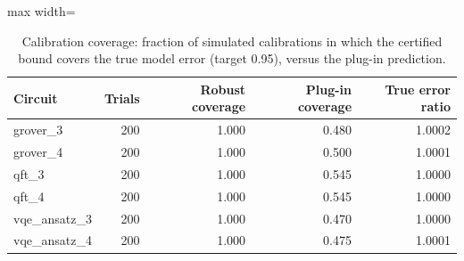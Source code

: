 \begin{table}[t]
\centering
\caption{Calibration coverage: fraction of simulated calibrations in which the certified bound covers the true model error (target 0.95), versus the plug-in prediction.}\label{tab:c4b}
\footnotesize
\begin{adjustbox}{max width=\columnwidth}
\begin{tabular}{lrrrr}
\toprule
Circuit & Trials & Robust coverage & Plug-in coverage & True error ratio \\
\midrule
grover\_3 & 200 & 1.000 & 0.480 & 1.0002 \\
grover\_4 & 200 & 1.000 & 0.500 & 1.0001 \\
qft\_3 & 200 & 1.000 & 0.545 & 1.0000 \\
qft\_4 & 200 & 1.000 & 0.545 & 1.0000 \\
vqe\_ansatz\_3 & 200 & 1.000 & 0.470 & 1.0000 \\
vqe\_ansatz\_4 & 200 & 1.000 & 0.475 & 1.0001 \\
\bottomrule
\end{tabular}
\end{adjustbox}
\end{table}
